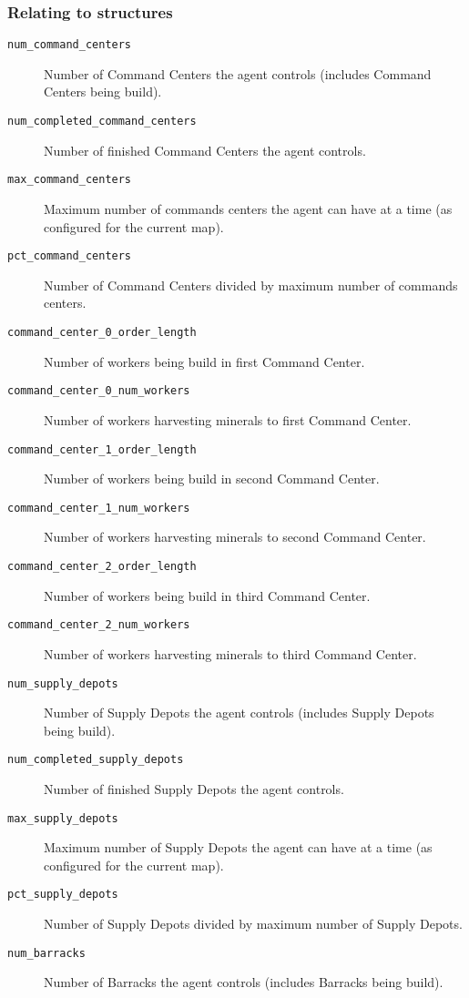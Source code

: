 \subsubsection*{Relating to structures}
\begin{description}
    \item[\texttt{num\_command\_centers}] Number of Command Centers the agent controls (includes Command Centers being build).
    \item[\texttt{num\_completed\_command\_centers}] Number of finished Command Centers the agent controls.
    \item[\texttt{max\_command\_centers}] Maximum number of commands centers the agent can have at a time (as configured for the current map).
    \item[\texttt{pct\_command\_centers}] Number of Command Centers divided by maximum number of commands centers.
    \item[\texttt{command\_center\_0\_order\_length}] Number of workers being build in first Command Center.
    \item[\texttt{command\_center\_0\_num\_workers}] Number of workers harvesting minerals to first Command Center.
    \item[\texttt{command\_center\_1\_order\_length}] Number of workers being build in second Command Center.
    \item[\texttt{command\_center\_1\_num\_workers}] Number of workers harvesting minerals to second Command Center.
    \item[\texttt{command\_center\_2\_order\_length}] Number of workers being build in third Command Center.
    \item[\texttt{command\_center\_2\_num\_workers}] Number of workers harvesting minerals to third Command Center.
    \item[\texttt{num\_supply\_depots}] Number of Supply Depots the agent controls (includes Supply Depots being build).
    \item[\texttt{num\_completed\_supply\_depots}] Number of finished Supply Depots the agent controls.
    \item[\texttt{max\_supply\_depots}] Maximum number of Supply Depots the agent can have at a time (as configured for the current map).
    \item[\texttt{pct\_supply\_depots}] Number of Supply Depots divided by maximum number of Supply Depots.
    \item[\texttt{num\_barracks}] Number of Barracks the agent controls (includes Barracks being build).

\end{description}
